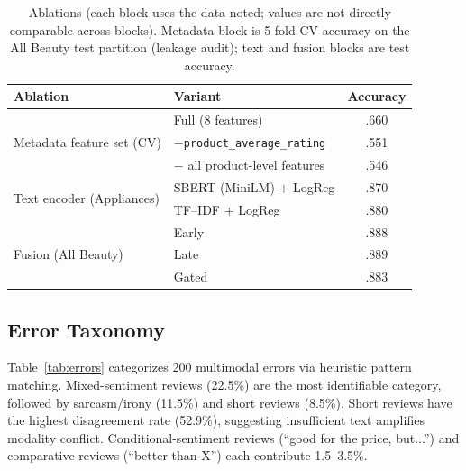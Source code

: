 \documentclass[11pt,a4paper]{article}
\begin{document}
\begin{table}[htbp]
\centering
\small
\caption{Ablations (each block uses the data noted; values are not directly comparable across blocks). Metadata block is 5-fold CV accuracy on the All Beauty test partition (leakage audit); text and fusion blocks are test accuracy.}
\label{tab:ablation}
\begin{tabular}{llc}
\toprule
\textbf{Ablation} & \textbf{Variant} & \textbf{Accuracy} \\
\midrule
\multirow{3}{*}{Metadata feature set (CV)}
  & Full (8 features)                 & .660 \\
  & $-$\texttt{product\_average\_rating}      & .551 \\
  & $-$ all product-level features    & .546 \\
\midrule
\multirow{2}{*}{Text encoder (Appliances)}
  & SBERT (MiniLM) $+$ LogReg         & .870 \\
  & TF--IDF $+$ LogReg                & .880 \\
\midrule
\multirow{3}{*}{Fusion (All Beauty)}
  & Early                             & .888 \\
  & Late                              & .889 \\
  & Gated                             & .883 \\
\bottomrule
\end{tabular}
\end{table}

\subsection{Error Taxonomy}

Table~\ref{tab:errors} categorizes 200 multimodal errors via heuristic pattern matching.
Mixed-sentiment reviews (22.5\%) are the most identifiable category, followed by sarcasm/irony (11.5\%) and short reviews (8.5\%).
Short reviews have the highest disagreement rate (52.9\%), suggesting insufficient text amplifies modality conflict.
Conditional-sentiment reviews (``good for the price, but...'') and comparative reviews (``better than X'') each contribute 1.5--3.5\%.
\end{document}
